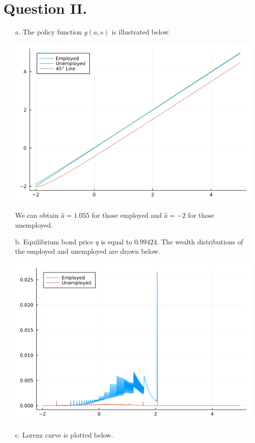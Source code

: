 \documentclass[11pt]{article}
\theoremstyle{definition}
\theoremstyle{definition}
\theoremstyle{definition}
\theoremstyle{definition}
\theoremstyle{definition}
\theoremstyle{definition}
\begin{document}
\pagebreak


\section*{Question II.}

\begin{itemize}
\item[a.] The policy function $g(a,s)$ is illustrated below.
\begin{center}
	\includegraphics[width=.8\linewidth]{./julia/policy_function.png}
\end{center}
We can obtain $\hat{a}=1.055$ for those employed and $\hat{a}=-2$ for those unemployed.\\
\item[b.] Equilibrium bond price $q$ is equal to $0.99424$. The wealth distributions of the employed and unemployed are drawn below.
\begin{center}
	\includegraphics[width=.8\linewidth]{./julia/wealth_distribution.png}
\end{center}
\pagebreak
\item[c.] Lorenz curve is plotted below.
\begin{center}

\end{center}
\end{itemize}
\end{document}
